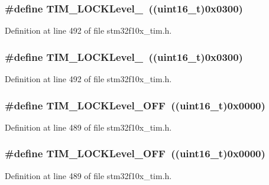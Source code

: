 \subsubsection[{\texorpdfstring{T\+I\+M\+\_\+\+L\+O\+C\+K\+Level\+\_\+3}{TIM_LOCKLevel_3}}]{\setlength{\rightskip}{0pt plus 5cm}\#define T\+I\+M\+\_\+\+L\+O\+C\+K\+Level\+\_~(({\bf uint16\+\_\+t})0x0300)}\hypertarget{group___lock__level_gaa0a0c1ffd9dc582d6571780c1747920b}{}\label{group___lock__level_gaa0a0c1ffd9dc582d6571780c1747920b}


Definition at line 492 of file stm32f10x\+\_\+tim.\+h.

\subsubsection[{\texorpdfstring{T\+I\+M\+\_\+\+L\+O\+C\+K\+Level\+\_\+3}{TIM_LOCKLevel_3}}]{\setlength{\rightskip}{0pt plus 5cm}\#define T\+I\+M\+\_\+\+L\+O\+C\+K\+Level\+\_~(({\bf uint16\+\_\+t})0x0300)}\hypertarget{group___lock__level_gaa0a0c1ffd9dc582d6571780c1747920b}{}\label{group___lock__level_gaa0a0c1ffd9dc582d6571780c1747920b}


Definition at line 492 of file stm32f10x\+\_\+tim.\+h.

\subsubsection[{\texorpdfstring{T\+I\+M\+\_\+\+L\+O\+C\+K\+Level\+\_\+\+O\+FF}{TIM_LOCKLevel_OFF}}]{\setlength{\rightskip}{0pt plus 5cm}\#define T\+I\+M\+\_\+\+L\+O\+C\+K\+Level\+\_\+\+O\+FF~(({\bf uint16\+\_\+t})0x0000)}\hypertarget{group___lock__level_ga84d318c62d3e5dfe7082610d03e11f2f}{}\label{group___lock__level_ga84d318c62d3e5dfe7082610d03e11f2f}


Definition at line 489 of file stm32f10x\+\_\+tim.\+h.

\subsubsection[{\texorpdfstring{T\+I\+M\+\_\+\+L\+O\+C\+K\+Level\+\_\+\+O\+FF}{TIM_LOCKLevel_OFF}}]{\setlength{\rightskip}{0pt plus 5cm}\#define T\+I\+M\+\_\+\+L\+O\+C\+K\+Level\+\_\+\+O\+FF~(({\bf uint16\+\_\+t})0x0000)}\hypertarget{group___lock__level_ga84d318c62d3e5dfe7082610d03e11f2f}{}\label{group___lock__level_ga84d318c62d3e5dfe7082610d03e11f2f}


Definition at line 489 of file stm32f10x\+\_\+tim.\+h.

